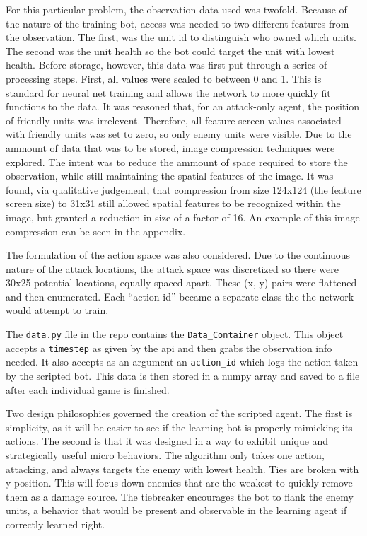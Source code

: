 \documentclass{amsart}
\newcounter{temp}
\theoremstyle{definition}
\begin{document}
For this particular problem, the observation data used was twofold.
Because of the nature of the training bot, access was needed to two different features from the observation.
The first, was the unit id to distinguish who owned which units.
The second was the unit health so the bot could target the unit with lowest health.
Before storage, however, this data was first put through a series of processing steps.
First, all values were scaled to between 0 and 1.
This is standard for neural net training and allows the network to more quickly fit functions to the data.
It was reasoned that, for an attack-only agent, the position of friendly units was irrelevent.
Therefore, all feature screen values associated with friendly units was set to zero, so only enemy units were visible.
Due to the ammount of data that was to be stored, image compression techniques were explored.
The intent was to reduce the ammount of space required to store the observation, while still maintaining the spatial features of the image.
It was found, via qualitative judgement, that compression from size 124x124 (the feature screen size) to 31x31 still allowed spatial features to be recognized within the image, but granted a reduction in size of a factor of 16.
An example of this image compression can be seen in the appendix.

The formulation of the action space was also considered.
Due to the continuous nature of the attack locations, the attack space was discretized so there were 30x25 potential locations, equally spaced apart.
These (x, y) pairs were flattened and then enumerated.
Each ``action id'' became a separate class the the network would attempt to train.

The {\tt data.py} file in the repo contains the {\tt Data\_Container} object.
This object accepts a {\tt timestep} as given by the api and then grabs the observation info needed.
It also accepts as an argument an {\tt action\_id} which logs the action taken by the scripted bot.
This data is then stored in a numpy array and saved to a file after each individual game is finished.

Two design philosophies governed the creation of the scripted agent.
The first is simplicity, as it will be easier to see if the learning bot is properly mimicking its actions.
The second is that it was designed in a way to exhibit unique and strategically useful micro behaviors.
The algorithm only takes one action, attacking, and always targets the enemy with lowest health.
Ties are broken with y-position.
This will focus down enemies that are the weakest to quickly remove them as a damage source.
The tiebreaker encourages the bot to flank the enemy units, a behavior that would be present and observable in the learning agent if correctly learned right.
\end{document}
